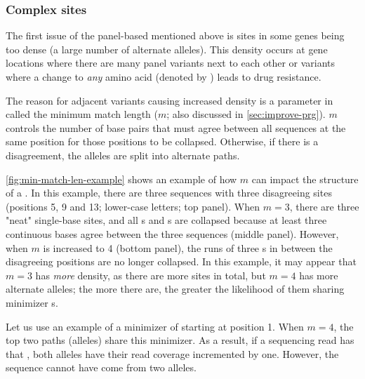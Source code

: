 \subsubsection{Complex \prg{} sites}
The first issue of the panel-based \prg{} mentioned above is sites in some genes being too dense (a large number of alternate alleles). This density occurs at gene locations where there are many panel variants next to each other or variants where a change to \emph{any} amino acid (denoted by ) leads to drug resistance. 

The reason for adjacent variants causing increased density is a parameter in \makeprg{} called the minimum match length ($m$; also discussed in \autoref{sec:improve-prg}). $m$ controls the number of base pairs that must agree between all sequences at the same position for those positions to be collapsed. Otherwise, if there is a disagreement, the alleles are split into alternate paths. 

\autoref{fig:min-match-len-example} shows an example of how $m$ can impact the structure of a \prg{}. In this example, there are three sequences with three disagreeing sites (positions 5, 9 and 13; lower-case letters; top panel). When $m=3$, there are three "neat" single-base sites, and all s and s are collapsed because at least three continuous bases agree between the three sequences (middle panel). However, when $m$ is increased to 4 (bottom panel), the runs of three s in between the disagreeing positions are no longer collapsed. In this example, it may appear that $m=3$ has \emph{more} density, as there are more sites in total, but $m=4$ has more alternate alleles; the more there are, the greater the likelihood of them sharing minimizer \kmer{}s. 

Let us use an example of a minimizer \kmer{} of  starting at position 1. When $m=4$, the top two paths (alleles) share this minimizer. As a result, if a sequencing read has that \kmer{}, both alleles have their read coverage incremented by one. However, the sequence cannot have come from two alleles.

